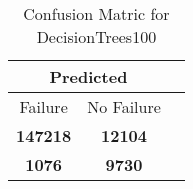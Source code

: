 \begin{table}[] 
\caption{Confusion Matric for DecisionTrees100} 
\label{Table: Prediction Accuracy-NoneDecisionTrees10070.0EKF-ignoreReflection-Reflection} 
\centering 
\begin{tabular} 
 {@{}ccc@{}} 
\toprule 
\multicolumn{2}{c}{\textbf{Predicted}}
 \\ \midrule 
\multicolumn{1}{|c|}{Failure} & 
\multicolumn{1}{c|}{No Failure}
 \\ \midrule 
\multicolumn{1}{|c|}{\color{green}\textbf{147218}} & 
\multicolumn{1}{c|}{\color{green}\textbf{12104}}
 \\ \midrule 
\multicolumn{1}{|c|}{\color{red}\textbf{1076}} & 
\multicolumn{1}{c|}{\color{red}\textbf{9730}}
 \\ \bottomrule 
\end{tabular} 
\end{table} 
